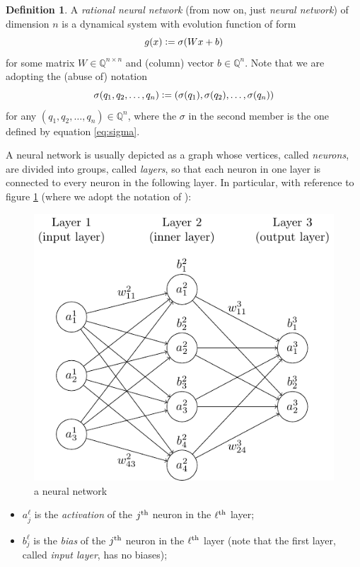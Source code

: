 \documentclass{book}
\newcommand{\defeq}{\vcentcolon=}
\newcommand{\Q}{\mathbb{Q}}
\theoremstyle{definition}
\newtheorem{definition}{Definition}[chapter]
\theoremstyle{plain}
\theoremstyle{plain}
\theoremstyle{remark}
\theoremstyle{plain}
\begin{document}
	\begin{definition}
		A \emph{rational neural network} (from now on, just \emph{neural network}) of dimension $n$ is a dynamical system with evolution function of form $$g(x) \defeq \sigma(Wx+b)$$ for some matrix $W \in \Q^{n \times n}$ and (column) vector $b \in \Q^n$. Note that we are adopting the (abuse of) notation 
		$$
			\sigma(q_1,q_2,\dots,q_n)\defeq(\sigma(q_1),\sigma(q_2),\dots,\sigma(q_n))
		$$
		for any $(q_1,q_2,\dots,q_n)\in\Q^n$, where the $\sigma$ in the second member is the one defined by equation \ref{eq:sigma}.
		
		A neural network is usually depicted as a graph whose vertices, called \emph{neurons}, are divided into groups, called \emph{layers}, so that each neuron in one layer is connected to every neuron in the following layer. In particular, with reference to figure \ref{fig:smallNet} (where we adopt the notation of \cite{nets}):
		\begin{figure}[t]
			\centering
			\includegraphics[scale=0.8]{smallNet.pdf}
			\caption{a neural network}
			\label{fig:smallNet}
		\end{figure}
		\begin{itemize}
			\item $a_j^\ell$ is the \emph{activation} of the $j\textsuperscript{th}$ neuron in the $\ell\textsuperscript{th}$ layer;
			\item $b_j^\ell$ is the \emph{bias} of the $j\textsuperscript{th}$ neuron in the $\ell\textsuperscript{th}$ layer (note that the first layer, called \emph{input layer}, has no biases);

\end{itemize}
\end{definition}
\end{document}
